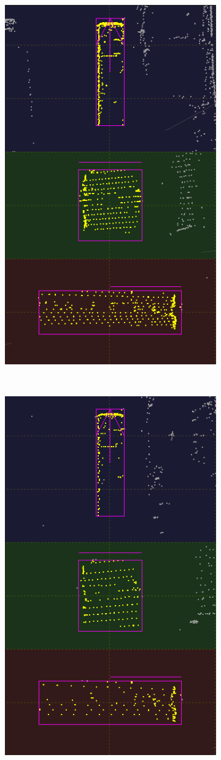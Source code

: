 \documentclass[letterpaper, 10 pt, conference]{ieeeconf}  %
\begin{document}
\begin{figure}[th]
\begin{subfigure}{0.16\linewidth}
		\includegraphics[scale=0.12]{./figures/transfer/bus-3}
		\caption{}
	\end{subfigure}
	~
	\begin{subfigure}{0.16\linewidth}
		\includegraphics[scale=0.12]{./figures/transfer/bus-5}

\end{subfigure}
\end{figure}
\end{document}
